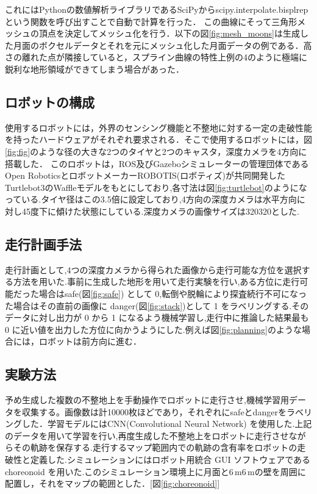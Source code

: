 \documentclass[twocolumn]{jarticle} %
\begin{document}
これにはPythonの数値解析ライブラリであるSciPyからscipy.interpolate.bisplrepという関数を呼び出すことで自動で計算を行った．
この曲線にそって三角形メッシュの頂点を決定してメッシュ化を行う．以下の図\ref{fig:mesh_moons}は生成した月面のボクセルデータとそれを元にメッシュ化した月面データの例である．高さの離れた点が隣接していると，スプライン曲線の特性上例の4のように極端に鋭利な地形領域ができてしまう場合があった．

\subsection{ロボットの構成}
使用するロボットには，外界のセンシング機能と不整地に対する一定の走破性能を持ったハードウェアがそれぞれ要求される．そこで使用するロボットには，図\ref{fig:fig}のような径の大きな2つのタイヤと2つのキャスタ，深度カメラを4方向に搭載した．
このロボットは，ROS及びGazeboシミュレーターの管理団体であるOpen RoboticsとロボットメーカーROBOTIS(ロボティズ)が共同開発したTurtlebot3\cite{bunken4}のWaffleモデルをもとにしており,各寸法は図\ref{fig:turtlebot}のようになっている.タイヤ径はこの3.5倍に設定しており,4方向の深度カメラは水平方向に対し45度下に傾けた状態にしている.深度カメラの画像サイズは320\times320とした.

\subsection{走行計画手法}
走行計画として,4つの深度カメラから得られた画像から走行可能な方位を選択する方法を用いた.事前に生成した地形を用いて走行実験を行い,ある方位に走行可能だった場合はsafe(図\ref{fig:safe}) として 0,転倒や脱輪により探査続行不可になった場合はその直前の画像に danger(図\ref{fig:stack})として 1 をラベリングする.そのデータに対し出力が 0 から 1 になるよう機械学習し,走行中に推論した結果最も 0 に近い値を出力した方位に向かうようにした.例えば図\ref{fig:planning}のような場合には，ロボットは前方向に進む．

\subsection{実験方法}
予め生成した複数の不整地上を手動操作でロボットに走行させ,機械学習用データを収集する。画像数は計10000枚ほどであり，それぞれにsafeとdangerをラベリングした．学習モデルにはCNN(Convolutional Neural Network) を使用した.上記のデータを用いて学習を行い,再度生成した不整地上をロボットに走行させながらその軌跡を保存する.走行するマップ範囲内での軌跡の含有率をロボットの走破性と定義した.\cite{bunken2}シミュレーションにはロボット用統合 GUI ソフトウェアであるchoreonoid を用いた.このシミュレーション環境上に月面と$6 \mathrm{\,m}$\times$6\mathrm{\,m}$の壁を周囲に配置し，それをマップの範囲とした．[図\ref{fig:choreonoid}]
\end{document}
